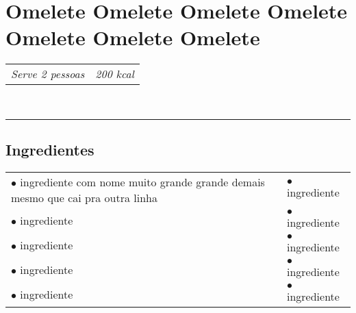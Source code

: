\newpage
\noindent
{}
\vspace*{0.335\paperheight}
\section*{\sectionformat Omelete Omelete Omelete Omelete Omelete Omelete Omelete} %
\vspace*{-0.1cm}
\begin{aemulticol}[width=0.495\textwidth,height=0.545\textheight]
	\begin{tabu} to 0.5\linewidth {X[l]X[r]}
	   \textit{Serve 2 pessoas} & \textit{200 kcal}
	\end{tabu}\\
	\rule[0.5ex]{0.5\linewidth}{1pt}
	\vspace*{-0.7cm}
	\subsection*{\subsectionformat Ingredientes}
	\vspace*{-0.15cm}
	\begin{tabu} to 0.5\linewidth {X[l]X[l]}
	   $\bullet$ ingrediente com nome muito grande grande demais mesmo que cai pra outra linha & $\bullet$ ingrediente\\
	   $\bullet$ ingrediente & $\bullet$ ingrediente\\
	   $\bullet$ ingrediente & $\bullet$ ingrediente\\
	   $\bullet$ ingrediente & $\bullet$ ingrediente\\
	   $\bullet$ ingrediente & $\bullet$ ingrediente
	\end{tabu}
	\vspace*{-0.15cm}

\end{aemulticol}
